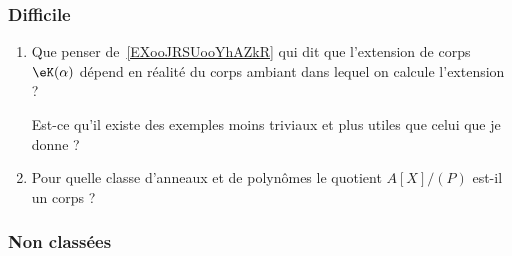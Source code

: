 \subsubsection{Difficile}

\begin{enumerate}
    \item   \label{ITEMooYWPLooMHuGzQ}
        Que penser de~\ref{EXooJRSUooYhAZkR} qui dit que l'extension de corps \( \eK(\alpha)\) dépend en réalité du corps ambiant dans lequel on calcule l'extension ?

        Est-ce qu'il existe des exemples moins triviaux et plus utiles que celui que je donne ?
    \item       \label{ITEMooUBZIooDDcfWg}
        Pour quelle classe d'anneaux et de polynômes le quotient \( A[X]/(P)\) est-il un corps ?
\end{enumerate}

\subsubsection{Non classées}

